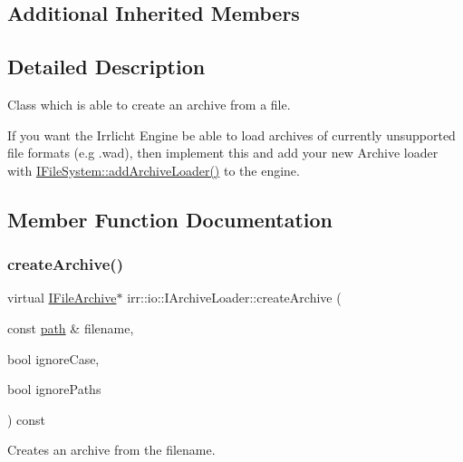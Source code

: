 \subsection*{Additional Inherited Members}


\subsection{Detailed Description}
Class which is able to create an archive from a file. 

If you want the Irrlicht Engine be able to load archives of currently unsupported file formats (e.\+g .wad), then implement this and add your new Archive loader with \hyperlink{classirr_1_1io_1_1IFileSystem_ad56456302b4697c49b461a909d9269b9}{I\+File\+System\+::add\+Archive\+Loader()} to the engine. 

\subsection{Member Function Documentation}
\mbox{\label{classirr_1_1io_1_1IArchiveLoader_a55e9586f190588e5fea6d17f63fb7aad}} 
\subsubsection{\texorpdfstring{create\+Archive()}{createArchive()}\hspace{0.1cm}{\footnotesize\ttfamily [1/4]}}
{\footnotesize\ttfamily virtual \hyperlink{classirr_1_1io_1_1IFileArchive}{I\+File\+Archive}$\ast$ irr\+::io\+::\+I\+Archive\+Loader\+::create\+Archive (\begin{DoxyParamCaption}\item[{const \hyperlink{namespaceirr_1_1io_a6468281622ce3a1c46b72e19f32dded5}{path} \&}]{filename,  }\item[{bool}]{ignore\+Case,  }\item[{bool}]{ignore\+Paths }\end{DoxyParamCaption}) const\hspace{0.3cm}{\ttfamily [pure virtual]}}



Creates an archive from the filename. 


